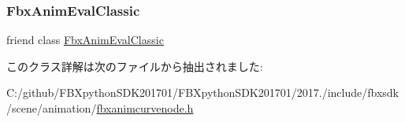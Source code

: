 \mbox{\label{class_fbx_anim_curve_node_a1b769b6684b71dfe76f350fef1137cab}} 
\subsubsection{\texorpdfstring{Fbx\+Anim\+Eval\+Classic}{FbxAnimEvalClassic}}
{\footnotesize\ttfamily friend class \hyperlink{class_fbx_anim_eval_classic}{Fbx\+Anim\+Eval\+Classic}\hspace{0.3cm}{\ttfamily [friend]}}



このクラス詳解は次のファイルから抽出されました\+:\begin{DoxyCompactItemize}
\item 
C\+:/github/\+F\+B\+Xpython\+S\+D\+K201701/\+F\+B\+Xpython\+S\+D\+K201701/2017./include/fbxsdk/scene/animation/\hyperlink{fbxanimcurvenode_8h}{fbxanimcurvenode.\+h}\end{DoxyCompactItemize}
